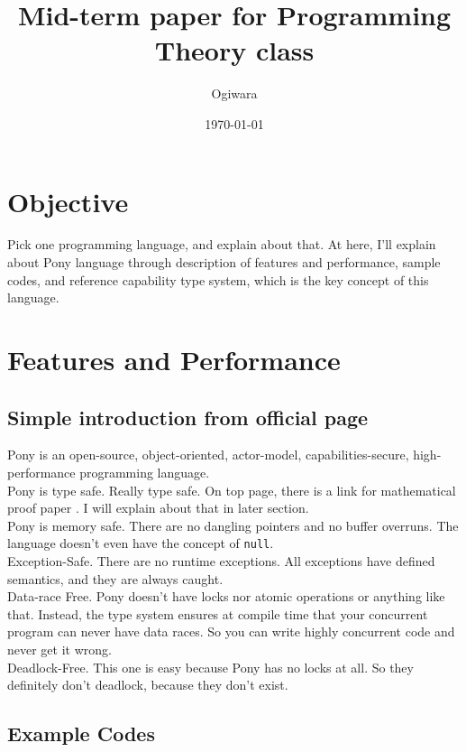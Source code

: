 \documentclass{article}
\title{Mid-term paper for Programming Theory class}
\author{Ogiwara}
\date{\today}
\begin{document}
\maketitle

\section{Objective}
Pick one programming language, and explain about that.
At here, I'll explain about Pony language \cite{ponylang} through description of features and performance, sample codes, and reference capability type system, which is the key concept of this language.


\section{Features and Performance}
\subsection{Simple introduction from official page \cite{ponylang}}
Pony is an open-source, object-oriented, actor-model, capabilities-secure, high-performance programming language. \\

Pony is type safe. Really type safe. On top page, there is a link for mathematical proof paper \cite{type-proof-paper}. I will explain about that in later section. \\

Pony is memory safe. There are no dangling pointers and no buffer overruns. The language doesn't even have the concept of \texttt{null}. \\

Exception-Safe. There are no runtime exceptions. All exceptions have defined semantics, and they are always caught. \\

Data-race Free. Pony doesn’t have locks nor atomic operations or anything like that. Instead, the type system ensures at compile time that your concurrent program can never have data races. So you can write highly concurrent code and never get it wrong. \\

Deadlock-Free. This one is easy because Pony has no locks at all. So they definitely don’t deadlock, because they don’t exist.

\subsection{Example Codes}
\end{document}
